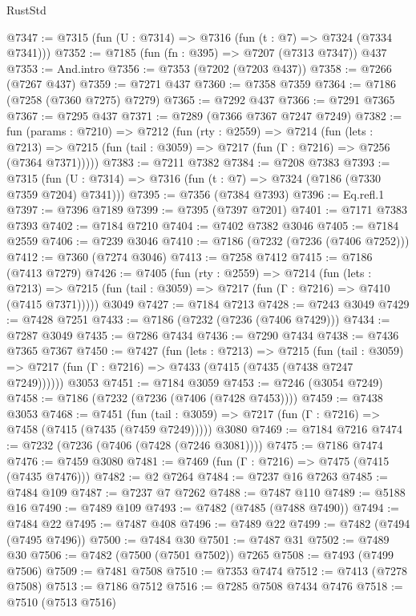 \begin{lexlean}{RustStd}
\begin{coremodule}
@7347 := @7315 (fun (U : @7314) => @7316 (fun (t : @7) => @7324 (@7334 @7341)))
@7352 := @7185 (fun (fn : @395) => @7207 (@7313 @7347)) @437
@7353 := And.intro
@7356 := @7353 (@7202 (@7203 @437))
@7358 := @7266 (@7267 @437)
@7359 := @7271 @437
@7360 := @7358 @7359
@7364 := @7186 (@7258 (@7360 @7275) @7279)
@7365 := @7292 @437
@7366 := @7291 @7365
@7367 := @7295 @437
@7371 := @7289 (@7366 @7367 @7247 @7249)
@7382 := fun (params : @7210) =>
  @7212
    (fun (rty : @2559) =>
    @7214
      (fun (lets : @7213) =>
      @7215 (fun (tail : @3059) => @7217 (fun (Γ : @7216) => @7256 (@7364 @7371)))))
@7383 := @7211 @7382
@7384 := @7208 @7383
@7393 := @7315 (fun (U : @7314) => @7316 (fun (t : @7) => @7324 (@7186 (@7330 @7359 @7204) @7341)))
@7395 := @7356 (@7384 @7393)
@7396 := Eq.refl.{1}
@7397 := @7396 @7189
@7399 := @7395 (@7397 @7201)
@7401 := @7171 @7383 @7393
@7402 := @7184 @7210
@7404 := @7402 @7382 @3046
@7405 := @7184 @2559
@7406 := @7239 @3046
@7410 := @7186 (@7232 (@7236 (@7406 @7252)))
@7412 := @7360 (@7274 @3046)
@7413 := @7258 @7412
@7415 := @7186 (@7413 @7279)
@7426 := @7405
    (fun (rty : @2559) =>
    @7214
      (fun (lets : @7213) =>
      @7215 (fun (tail : @3059) => @7217 (fun (Γ : @7216) => @7410 (@7415 @7371)))))
    @3049
@7427 := @7184 @7213
@7428 := @7243 @3049
@7429 := @7428 @7251
@7433 := @7186 (@7232 (@7236 (@7406 @7429)))
@7434 := @7287 @3049
@7435 := @7286 @7434
@7436 := @7290 @7434
@7438 := @7436 @7365 @7367
@7450 := @7427
    (fun (lets : @7213) =>
    @7215
      (fun (tail : @3059) => @7217 (fun (Γ : @7216) => @7433 (@7415 (@7435 (@7438 @7247 @7249))))))
    @3053
@7451 := @7184 @3059
@7453 := @7246 (@3054 @7249)
@7458 := @7186 (@7232 (@7236 (@7406 (@7428 @7453))))
@7459 := @7438 @3053
@7468 := @7451
    (fun (tail : @3059) => @7217 (fun (Γ : @7216) => @7458 (@7415 (@7435 (@7459 @7249)))))
    @3080
@7469 := @7184 @7216
@7474 := @7232 (@7236 (@7406 (@7428 (@7246 @3081))))
@7475 := @7186 @7474
@7476 := @7459 @3080
@7481 := @7469 (fun (Γ : @7216) => @7475 (@7415 (@7435 @7476)))
@7482 := @2 @7264
@7484 := @7237 @16 @7263
@7485 := @7484 @109
@7487 := @7237 @7 @7262
@7488 := @7487 @110
@7489 := @5188 @16
@7490 := @7489 @109
@7493 := @7482 (@7485 (@7488 @7490))
@7494 := @7484 @22
@7495 := @7487 @408
@7496 := @7489 @22
@7499 := @7482 (@7494 (@7495 @7496))
@7500 := @7484 @30
@7501 := @7487 @31
@7502 := @7489 @30
@7506 := @7482 (@7500 (@7501 @7502)) @7265
@7508 := @7493 (@7499 @7506)
@7509 := @7481 @7508
@7510 := @7353 @7474
@7512 := @7413 (@7278 @7508)
@7513 := @7186 @7512
@7516 := @7285 @7508 @7434 @7476
@7518 := @7510 (@7513 @7516)

\end{coremodule}
\end{lexlean}
